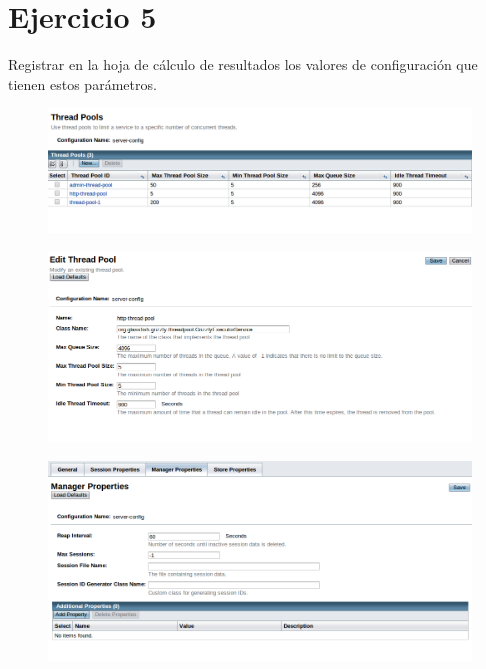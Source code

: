 \documentclass[a4paper, 10pt]{article}
\begin{document}
\section{Ejercicio 5}
\begin{mdframed} 
Registrar en la hoja de cálculo de resultados los valores de configuración que tienen estos 
parámetros.
\end{mdframed}

\begin{figure}[hbtp]
	 	\centering
	 	\includegraphics[width=1.1\textwidth]{../../p2/pantallazos/ej5_conf_2.png}
	 	\caption{}
\end{figure}

\begin{figure}[hbtp]
	 	\centering
	 	\includegraphics[width=1.1\textwidth]{../../p2/pantallazos/ej5_conf_3.png}
	 	\caption{}
\end{figure}

\begin{figure}[hbtp]
	 	\centering
	 	\includegraphics[width=1.1\textwidth]{../../p2/pantallazos/ej5_conf_4.png}
	 	\caption{}
\end{figure}
\end{document}
